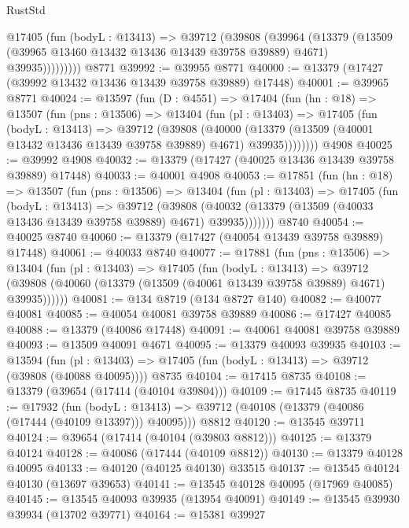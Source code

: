\begin{lexlean}{RustStd}
\begin{coremodule}
            @17405
              (fun (bodyL : @13413) =>
              @39712
                (@39808
                  (@39964
                    (@13379
                      (@13509 (@39965 @13460 @13432 @13436 @13439 @39758 @39889) @4671)
                      @39935)))))))))
    @8771
@39992 := @39955 @8771
@40000 := @13379 (@17427 (@39992 @13432 @13436 @13439 @39758 @39889) @17448)
@40001 := @39965 @8771
@40024 := @13597
    (fun (D : @4551) =>
    @17404
      (fun (hn : @18) =>
      @13507
        (fun (pns : @13506) =>
        @13404
          (fun (pl : @13403) =>
          @17405
            (fun (bodyL : @13413) =>
            @39712
              (@39808
                (@40000
                  (@13379 (@13509 (@40001 @13432 @13436 @13439 @39758 @39889) @4671) @39935))))))))
    @4908
@40025 := @39992 @4908
@40032 := @13379 (@17427 (@40025 @13436 @13439 @39758 @39889) @17448)
@40033 := @40001 @4908
@40053 := @17851
    (fun (hn : @18) =>
    @13507
      (fun (pns : @13506) =>
      @13404
        (fun (pl : @13403) =>
        @17405
          (fun (bodyL : @13413) =>
          @39712
            (@39808
              (@40032 (@13379 (@13509 (@40033 @13436 @13439 @39758 @39889) @4671) @39935)))))))
    @8740
@40054 := @40025 @8740
@40060 := @13379 (@17427 (@40054 @13439 @39758 @39889) @17448)
@40061 := @40033 @8740
@40077 := @17881
    (fun (pns : @13506) =>
    @13404
      (fun (pl : @13403) =>
      @17405
        (fun (bodyL : @13413) =>
        @39712 (@39808 (@40060 (@13379 (@13509 (@40061 @13439 @39758 @39889) @4671) @39935))))))
@40081 := @134 @8719 (@134 @8727 @140)
@40082 := @40077 @40081
@40085 := @40054 @40081 @39758 @39889
@40086 := @17427 @40085
@40088 := @13379 (@40086 @17448)
@40091 := @40061 @40081 @39758 @39889
@40093 := @13509 @40091 @4671
@40095 := @13379 @40093 @39935
@40103 := @13594
    (fun (pl : @13403) => @17405 (fun (bodyL : @13413) => @39712 (@39808 (@40088 @40095))))
    @8735
@40104 := @17415 @8735
@40108 := @13379 (@39654 (@17414 (@40104 @39804)))
@40109 := @17445 @8735
@40119 := @17932
    (fun (bodyL : @13413) => @39712 (@40108 (@13379 (@40086 (@17444 (@40109 @13397))) @40095)))
    @8812
@40120 := @13545 @39711
@40124 := @39654 (@17414 (@40104 (@39803 @8812)))
@40125 := @13379 @40124
@40128 := @40086 (@17444 (@40109 @8812))
@40130 := @13379 @40128 @40095
@40133 := @40120 (@40125 @40130) @33515
@40137 := @13545 @40124 @40130 (@13697 @39653)
@40141 := @13545 @40128 @40095 (@17969 @40085)
@40145 := @13545 @40093 @39935 (@13954 @40091)
@40149 := @13545 @39930 @39934 (@13702 @39771)
@40164 := @15381
    @39927

\end{coremodule}
\end{lexlean}
